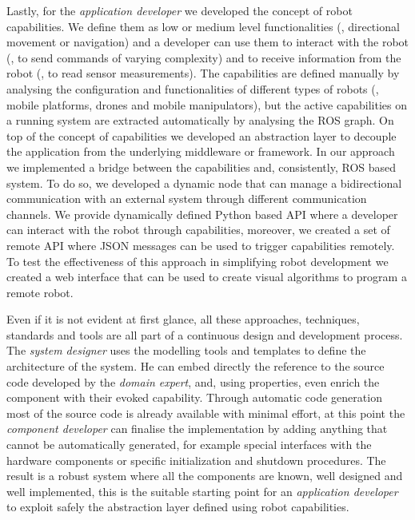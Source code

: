 Lastly, for the \textit{application developer} we developed the concept of robot capabilities. We define them as low or medium level functionalities (\eg, directional movement or navigation) and a developer can use them to interact with the robot (\ie, to send commands of varying complexity) and to receive information from the robot (\ie, to read sensor measurements). The capabilities are defined manually by analysing the configuration and functionalities of different types of robots (\ie, mobile platforms, drones and mobile manipulators), but the active capabilities on a running system are extracted automatically by analysing the ROS graph. On top of the concept of capabilities we developed an abstraction layer to decouple the application from the underlying middleware or framework. In our approach we implemented a bridge between the capabilities and, consistently, ROS based system. To do so, we developed a dynamic node that can manage a bidirectional communication with an external system through different communication channels. We provide dynamically defined Python based API where a developer can interact with the robot through capabilities, moreover, we created a set of remote API where JSON messages can be used to trigger capabilities remotely. To test the effectiveness of this approach in simplifying robot development we created a web interface that can be used to create visual algorithms to program a remote robot.

Even if it is not evident at first glance, all these approaches, techniques, standards and tools are all part of a continuous design and development process. The \textit{system designer} uses the modelling tools and templates to define the architecture of the system. He can embed directly the reference to the source code developed by the \textit{domain expert}, and, using properties, even enrich the component with their evoked capability. Through automatic code generation most of the source code is already available with minimal effort, at this point the \textit{component developer} can finalise the implementation by adding anything that cannot be automatically generated, for example special interfaces with the hardware components or specific initialization and shutdown procedures. The result is a robust system where all the components are known, well designed and well implemented, this is the suitable starting point for an \textit{application developer} to exploit safely the abstraction layer defined using robot capabilities.

